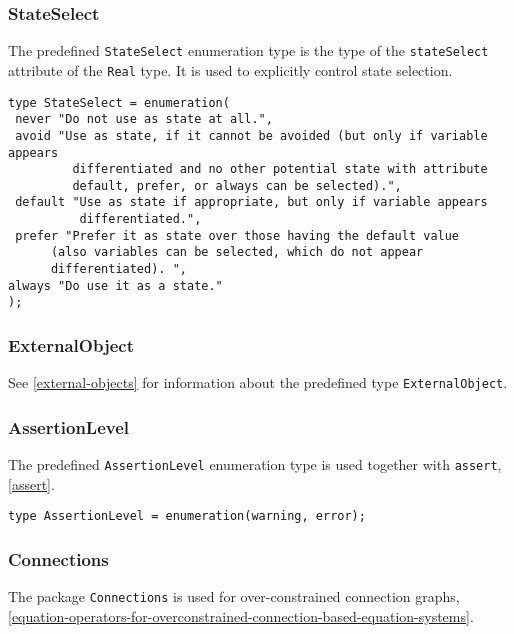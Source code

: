 \subsubsection{StateSelect}\label{stateselect}

The predefined \lstinline!StateSelect! enumeration type is the type of the \lstinline!stateSelect! attribute of the \lstinline!Real! type.  It is used to explicitly control state selection.

\begin{lstlisting}[language=modelica]
type StateSelect = enumeration(
 never "Do not use as state at all.",
 avoid "Use as state, if it cannot be avoided (but only if variable appears
         differentiated and no other potential state with attribute
         default, prefer, or always can be selected).",
 default "Use as state if appropriate, but only if variable appears
          differentiated.",
 prefer "Prefer it as state over those having the default value
      (also variables can be selected, which do not appear
      differentiated). ",
always "Do use it as a state."
);
\end{lstlisting}

\subsubsection{ExternalObject}\label{externalobject}

See \cref{external-objects} for information about the predefined type \lstinline!ExternalObject!.

\subsubsection{AssertionLevel}\label{assertionlevel}

The predefined \lstinline!AssertionLevel! enumeration type is used together with \lstinline!assert!, \cref{assert}.
\begin{lstlisting}[language=modelica]
type AssertionLevel = enumeration(warning, error);
\end{lstlisting}

\subsubsection{Connections}\label{connections}

The package \lstinline!Connections! is used for over-constrained connection graphs, \cref{equation-operators-for-overconstrained-connection-based-equation-systems}.

